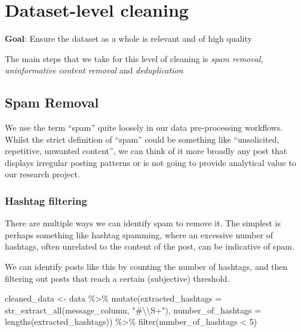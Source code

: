 \documentclass[
  letterpaper,
  DIV=11,
  numbers=noendperiod]{scrreprt}
\newenvironment{Shaded}{\begin{snugshade}}{\end{snugshade}}
\newcommand{\AttributeTok}[1]{\textcolor[rgb]{0.40,0.45,0.13}{#1}}
\newcommand{\DecValTok}[1]{\textcolor[rgb]{0.68,0.00,0.00}{#1}}
\newcommand{\FunctionTok}[1]{\textcolor[rgb]{0.28,0.35,0.67}{#1}}
\newcommand{\NormalTok}[1]{\textcolor[rgb]{0.00,0.23,0.31}{#1}}
\newcommand{\OtherTok}[1]{\textcolor[rgb]{0.00,0.23,0.31}{#1}}
\newcommand{\SpecialCharTok}[1]{\textcolor[rgb]{0.37,0.37,0.37}{#1}}
\newcommand{\StringTok}[1]{\textcolor[rgb]{0.13,0.47,0.30}{#1}}
\begin{document}
\section{Dataset-level cleaning}\label{dataset-level-cleaning}

\textbf{Goal}: Ensure the dataset as a whole is relevant and of high
quality

The main steps that we take for this level of cleaning is \emph{spam
removal}, \emph{uninformative content removal} and \emph{deduplication}

\subsection{Spam Removal}\label{spam-removal}

We use the term ``spam'' quite loosely in our data pre-processing
workflows. Whilst the strict definition of ``spam'' could be something
like ``unsolicited, repetitive, unwanted content'', we can think of it
more broadly any post that displays irregular posting patterns or is not
going to provide analytical value to our research project.

\subsubsection{Hashtag filtering}\label{hashtag-filtering}

There are multiple ways we can identify spam to remove it. The simplest
is perhaps something like hashtag spamming, where an excessive number of
hashtags, often unrelated to the content of the post, can be indicative
of spam.

We can identify posts like this by counting the number of hashtags, and
then filtering out posts that reach a certain (subjective) threshold.

\begin{Shaded}
\begin{Highlighting}[]
\NormalTok{cleaned\_data }\OtherTok{\textless{}{-}}\NormalTok{ data }\SpecialCharTok{\%\textgreater{}\%} 
  \FunctionTok{mutate}\NormalTok{(}\AttributeTok{extracted\_hashtags =} \FunctionTok{str\_extract\_all}\NormalTok{(message\_column, }\StringTok{"\#}\SpecialCharTok{\textbackslash{}\textbackslash{}}\StringTok{S+"}\NormalTok{),}
         \AttributeTok{number\_of\_hashtags =} \FunctionTok{lengths}\NormalTok{(extracted\_hashtags)) }\SpecialCharTok{\%\textgreater{}\%} 
  \FunctionTok{filter}\NormalTok{(number\_of\_hashtags }\SpecialCharTok{\textless{}} \DecValTok{5}\NormalTok{)}
\end{Highlighting}
\end{Shaded}
\end{document}
